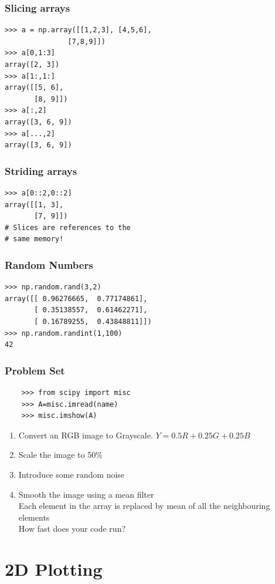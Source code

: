 \documentclass[14pt,compress]{beamer}
\newcounter{time}
\newcommand{\inctime}[1]{\addtocounter{time}{#1}{\tiny \thetime\ m}}
\begin{document}
\begin{frame}[fragile]
  \frametitle{Slicing arrays}
\begin{lstlisting}
>>> a = np.array([[1,2,3], [4,5,6], 
               [7,8,9]])
>>> a[0,1:3]
array([2, 3])
>>> a[1:,1:]
array([[5, 6],
       [8, 9]])
>>> a[:,2]
array([3, 6, 9])
>>> a[...,2]
array([3, 6, 9])
\end{lstlisting}
\end{frame}

\begin{frame}[fragile]
  \frametitle{Striding arrays}
\begin{lstlisting}
>>> a[0::2,0::2]
array([[1, 3],
       [7, 9]])
# Slices are references to the 
# same memory!
\end{lstlisting}
\end{frame}

\begin{frame}[fragile]
\frametitle{Random Numbers}
\begin{lstlisting}
>>> np.random.rand(3,2)
array([[ 0.96276665,  0.77174861],
       [ 0.35138557,  0.61462271],
       [ 0.16789255,  0.43848811]])
>>> np.random.randint(1,100)
42
\end{lstlisting}
\inctime{15}
\end{frame}

\begin{frame}[fragile]
  \frametitle{Problem Set}
  \begin{lstlisting}
    >>> from scipy import misc
    >>> A=misc.imread(name)
    >>> misc.imshow(A)
  \end{lstlisting}
    \begin{enumerate}
    \item Convert an RGB image to Grayscale. $ Y = 0.5R + 0.25G + 0.25B $
    \item Scale the image to 50\%
    \item Introduce some random noise
    \item Smooth the image using a mean filter
      \\\small{Each element in the array is replaced by mean of all the neighbouring elements}
      \\\small{How fast does your code run?}
    \end{enumerate}
\inctime{15}
\end{frame}

\section{2D Plotting}
\end{document}
